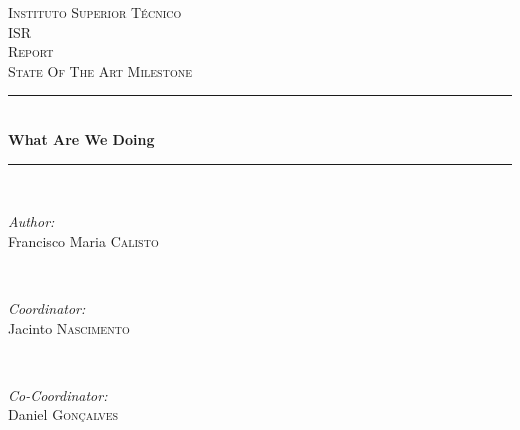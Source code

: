 \begin{titlepage}

\newcommand{\HRule}{\rule{\linewidth}{0.5mm}} %

\center %
 

\textsc{\LARGE Instituto Superior T\'{e}cnico}\\[1.5cm]
\textsc{\Large ISR}\\[0.5cm]
\textsc{\large Report}\\[0.25cm]
\textsc{\small State Of The Art Milestone}\\[0.25cm]


\HRule \\[0.5cm]
{ \large \bfseries What Are We Doing}\\[0.25cm] %
\HRule \\[0.5cm]
 

\begin{minipage}{0.4\textwidth}
\begin{flushleft} \large
\emph{Author:}\\
Francisco Maria \textsc{Calisto} %
\end{flushleft}
\end{minipage}
~
\begin{minipage}{0.4\textwidth}
\begin{flushright} \large
\emph{Coordinator:} \\
Jacinto \textsc{Nascimento} %
\end{flushright}
~
\begin{flushright} \large
\emph{Co-Coordinator:} \\
Daniel \textsc{Gon\c{c}alves} %
\end{flushright}
\end{minipage}\\[2cm]


\end{titlepage}
